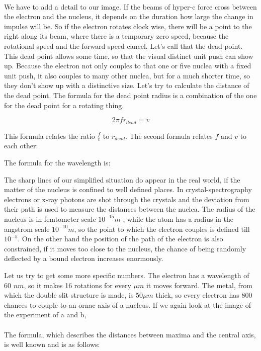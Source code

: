 \paragraph{}
We have to add a detail to our image. If the beams of hyper-c force cross between the electron and the nucleus, it depends on the duration how large the change in impulse will be. So if the electron rotates clock wise, there will be a point to the right along its beam, where there is a temporary zero speed, because the rotational speed and the forward speed cancel. Let's call that the dead point. This dead point allows some time, so that the visual distinct unit push can show up. Because the electron not only couples to that one or five nuclea with a fixed unit push, it also couples to many other nuclea, but for a much shorter time, so they don't show up with a distinctive size. Let's try to calculate the distance of the dead point.
The formula for the dead point radius is a combination of the one for the dead point for a rotating thing.

\[2\pi f r_{dead} = v\]

This formula relates the ratio $\frac{f}{v}$ to $r_{dead}$. The second formula relates $f$ and $v$  to each other:

The formula for the wavelength is:

The sharp lines of our simplified situation do appear in the real world, if the matter of the nucleus is confined to well defined places. In crystal-spectrography electrons or x-ray photons are shot through the crystals and the deviation from their path is used to measure the distances between the nuclea. The radius of the nucleus is in femtometer scale $10^{-15} m$ , while the atom has a radius in the angstrom scale $10^{-10} m$, so the point to which the electron couples is defined till $10^{-5}$. On the other hand the position of the path of the electron is also constrained, if it moves too close to the nucleus, the chance of being randomly deflected by a bound electron increases enormously.

Let us try to get some more specific numbers. The electron has a wavelength of 60 $nm$, so it makes 16 rotations for every $\mu m$ it moves forward. The metal, from which the double slit structure is made, is $50 \mu m$ thick, so every electron has 800 chances to couple to an ornac-axis of a nucleus. If we again look at the image of the experiment of a and b,

\paragraph{}
The formula, which describes the distances between maxima and the central axis, is well known and is as follows:

